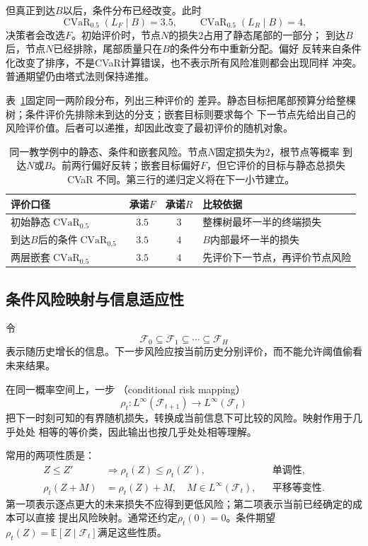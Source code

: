 但真正到达\(B\)以后，条件分布已经改变。此时
\[
  \operatorname{CVaR}_{0.5}(L_F\mid B)=3.5,
  \qquad
  \operatorname{CVaR}_{0.5}(L_R\mid B)=4,
\]
决策者会改选\(F\)。初始评价时，节点\(N\)的损失\(2\)占用了静态尾部的一部分；
到达\(B\)后，节点\(N\)已经排除，尾部质量只在\(B\)的条件分布中重新分配。偏好
反转来自条件化改变了排序，不是CVaR计算错误，也不表示所有风险准则都会出现同样
冲突。普通期望仍由塔式法则保持递推。

表~\ref{tab:decision-static-conditional-nested}固定同一两阶段分布，列出三种评价的
差异。静态目标把尾部预算分给整棵树；条件评价先排除未到达的分支；嵌套目标则要求每个
下一节点先给出自己的风险评价值。后者可以递推，却因此改变了最初评价的随机对象。

\begin{table}[htbp]
  \centering
  \begin{tabularx}{\linewidth}{XccX}
    \toprule
    评价口径 & 承诺$F$ & 承诺$R$ & 比较依据\\
    \midrule
    初始静态$\operatorname{CVaR}_{0.5}$ & $3.5$ & $3$ & 整棵树最坏一半的终端损失\\
    到达$B$后的条件$\operatorname{CVaR}_{0.5}$ & $3.5$ & $4$ & $B$内部最坏一半的损失\\
    两层嵌套$\operatorname{CVaR}_{0.5}$ & $3.5$ & $4$ & 先评价下一节点，再评价节点风险\\
    \bottomrule
  \end{tabularx}
  \caption{同一教学例中的静态、条件和嵌套风险。节点$N$固定损失为$2$，根节点等概率
  到达$N$或$B$。前两行偏好反转；嵌套目标偏好$F$，但它评价的目标与静态总损失CVaR
  不同。第三行的递归定义将在下一小节建立。}
  \label{tab:decision-static-conditional-nested}
\end{table}

\subsection{条件风险映射与信息适应性}
令
\[
  \mathcal{F}_0\subseteq\mathcal{F}_1\subseteq\cdots
  \subseteq\mathcal{F}_H
\]
表示随历史增长的信息。下一步风险应按当前历史分别评价，而不能允许阈值偷看未来结果。
\begin{definition}[一步条件风险映射]
\label{def:decision-conditional-risk-mapping}
在同一概率空间上，一步
（conditional risk mapping）
\[
  \rho_t:
  L^\infty(\mathcal{F}_{t+1})
  \longrightarrow
  L^\infty(\mathcal{F}_t)
\]
把下一时刻可知的有界随机损失，转换成当前信息下可比较的风险。映射作用于几乎处处
相等的等价类，因此输出也按几乎处处相等理解。
\end{definition}
常用的两项性质是：
\begin{align}
  Z\leq Z'
  &\Longrightarrow
  \rho_t(Z)\leq\rho_t(Z'),
  &&\text{单调性},
  \label{eq:decision-conditional-risk-monotonicity}\\
  \rho_t(Z+M)
  &=
  \rho_t(Z)+M,
  \quad M\in L^\infty(\mathcal{F}_t),
  &&\text{平移等变性}.
  \label{eq:decision-conditional-risk-translation}
\end{align}
第一项表示逐点更大的未来损失不应得到更低风险；第二项表示当前已经确定的成本可以直接
提出风险映射。通常还约定\(\rho_t(0)=0\)。条件期望
\(\rho_t(Z)=\mathbb{E}[Z\mid\mathcal{F}_t]\)满足这些性质。

